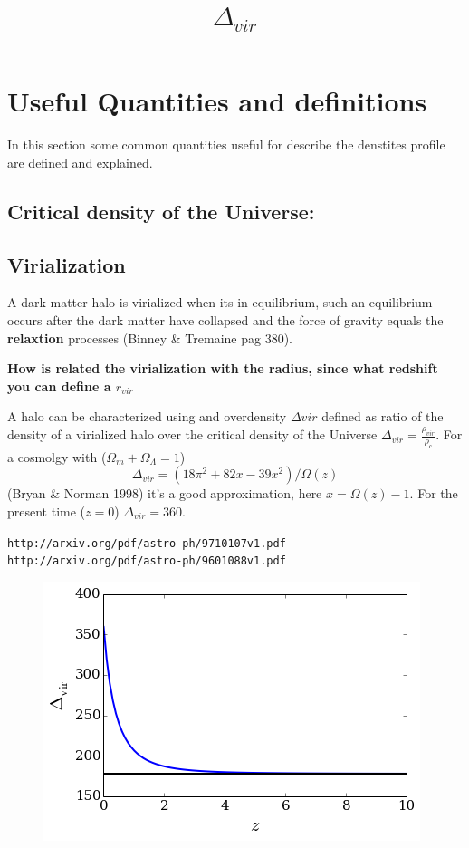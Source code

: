 \documentclass[12pt]{article}
\title{\begin{LARGE}
{$\Delta_{vir}$}
\end{LARGE}}
\begin{document}
\maketitle


\section{Useful Quantities and definitions}

In this section some common quantities useful for describe the denstites profile
are defined and explained. 


\subsection{Critical density of the Universe:}

\subsection{Virialization}

A dark matter halo is virialized when its in equilibrium, such 
an equilibrium occurs after the dark matter have collapsed and 
the force of gravity equals the \textbf{relaxtion} processes
(Binney \& Tremaine pag 380).


\textbf{How is related the virialization with the radius, since what redshift 
you can define a $r_{vir}$}

A halo can be characterized using and overdensity $\Delta{vir}$
defined as ratio of the density of a virialized halo over the critical 
density of the Universe $\Delta_{vir} = \frac{\rho_{vir}}{\rho_c}$.
For a cosmolgy with ($\Omega_m + \Omega_{\Lambda} = 1$) 
\begin{equation}
\Delta_{vir} = (18 \pi^2 + 82x - 39x^2)/\Omega(z) 
\end{equation}
(Bryan \& Norman 1998) it's a good approximation, here $x=\Omega(z)-1$.
For the present time ($z=0$)  $\Delta_{vir}=360$.

\verb+http://arxiv.org/pdf/astro-ph/9710107v1.pdf+ \\
\verb+http://arxiv.org/pdf/astro-ph/9601088v1.pdf+


\begin{figure}[h]
\centering
\includegraphics[scale=0.7]{deltavir.png}
\end{figure}
\end{document}

